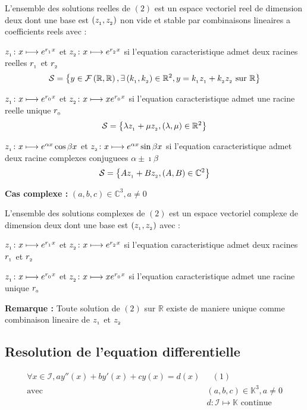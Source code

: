 \documentclass[12pt,twoside,a4paper]{article}
\begin{document}
			\begin{tab}
				L'ensemble des solutions reelles de $\left(2\right)$ est un espace vectoriel reel de dimension deux dont une base est $\left(z_{_{1}},z_{_{2}}\right)$ non vide et stable par combinaisons lineaires a coefficients reels avec :
				\begin{liste}
					\item $z_{_{1}}\colon x\longmapsto e^{r_{_{1}}x}$ et $z_{_{2}}\colon x\longmapsto e^{r_{_{2}}x}$ si l'equation caracteristique admet deux racines reelles $r_{_{1}}$ et $r_{_{2}}$
						$$
							\mathcal{S}=\left\{y\in\mathcal{F}\left(\mathbb{R},\mathbb{R}\right),\exists\left(k_{_{1}},k_{_{2}}\right)\in\mathbb{R}^2,y=k_{_{1}}z_{_{1}}+k_{_{2}}z_{_{2}}\text{ sur }\mathbb{R}\right\}
						$$
					\item $z_{_{1}}\colon x\longmapsto e^{r_{_{0}}x}$ et $z_{_{2}}\colon x\longmapsto xe^{r_{_{0}}x}$ si l'equation caracteristique admet une racine reelle unique $r_{_{0}}$
						$$
							\mathcal{S}=\left\{\lambda z_{_{1}}+\mu z_{_{2}},\left(\lambda,\mu\right)\in\mathbb{R}^2\right\}
						$$
					\item $z_{_{1}}\colon x\longmapsto e^{\alpha x}\cos\beta x$ et $z_{_{2}}\colon x\longmapsto e^{\alpha x}\sin\beta x$ si l'equation caracteristique admet deux racine complexes conjuguees $\alpha\pm\imath\beta$
						$$
							\mathcal{S}=\left\{Az_{_{1}}+Bz_{_{2}},\left(A,B\right)\in\mathbb{C}^2\right\}
						$$
				\end{liste}
			\end{tab}
			\textbf{Cas complexe :} $\left(a,b,c\right)\in\mathbb{C}^3,a\neq0$
			\begin{tab}
				L'ensemble des solutions complexes de $\left(2\right)$ est un espace vectoriel complexe de dimension deux dont une base est $\left(z_{_{1}},z_{_{2}}\right)$ avec :
				\begin{liste}
					\item $z_{_{1}}\colon x\longmapsto e^{r_{_{1}}x}$ et $z_{_{2}}\colon x\longmapsto e^{r_{_{2}}x}$ si l'equation caracteristique admet deux racines $r_{_{1}}$ et $r_{_{2}}$
					\item $z_{_{1}}\colon x\longmapsto e^{r_{_{0}}x}$ et $z_{_{2}}\colon x\longmapsto xe^{r_{_{0}}x}$ si l'equation caracteristique admet une racine unique $r_{_{0}}$
				\end{liste}
			\end{tab}
			\textbf{Remarque :} Toute solution de $\left(2\right)$ sur $\mathbb{R}$ existe de maniere unique comme combinaison lineaire de $z_{_{1}}$ et $z_{_{2}}$
		\subsection{Resolution de l'equation differentielle}
			$$\begin{aligned}
				\forall x\in\mathcal{I},ay''\left(x\right)+by'\left(x\right)+cy\left(x\right)=d\left(x\right)& \ \ \ \left(1\right)\\
																								\text{avec}&\left(a,b,c\right)\in\mathbb{K}^3,a\neq0 \\
																												&d\colon\mathcal{I}\longmapsto\mathbb{K}\text{ continue}
			\end{aligned}$$
\end{document}
